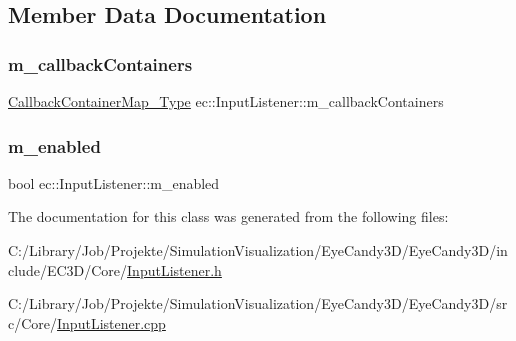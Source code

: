 \subsection{Member Data Documentation}
\mbox{\label{classec_1_1_input_listener_a4553825c97688ab1827d6f4849c92b61}} 
\subsubsection{\texorpdfstring{m\+\_\+callback\+Containers}{m\_callbackContainers}}
{\footnotesize\ttfamily \mbox{\hyperlink{classec_1_1_input_listener_abf0825f1f31a1373c5c03e51da123148}{Callback\+Container\+Map\+\_\+\+Type}} ec\+::\+Input\+Listener\+::m\+\_\+callback\+Containers\hspace{0.3cm}{\ttfamily [protected]}}

\mbox{\label{classec_1_1_input_listener_af36b5fc46ed59886d73b1613aaef5a47}} 
\subsubsection{\texorpdfstring{m\+\_\+enabled}{m\_enabled}}
{\footnotesize\ttfamily bool ec\+::\+Input\+Listener\+::m\+\_\+enabled\hspace{0.3cm}{\ttfamily [protected]}}



The documentation for this class was generated from the following files\+:\begin{DoxyCompactItemize}
\item 
C\+:/\+Library/\+Job/\+Projekte/\+Simulation\+Visualization/\+Eye\+Candy3\+D/\+Eye\+Candy3\+D/include/\+E\+C3\+D/\+Core/\mbox{\hyperlink{_input_listener_8h}{Input\+Listener.\+h}}\item 
C\+:/\+Library/\+Job/\+Projekte/\+Simulation\+Visualization/\+Eye\+Candy3\+D/\+Eye\+Candy3\+D/src/\+Core/\mbox{\hyperlink{_input_listener_8cpp}{Input\+Listener.\+cpp}}\end{DoxyCompactItemize}
